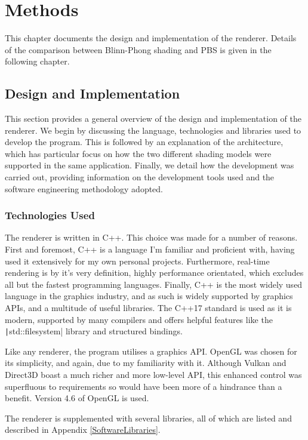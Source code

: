 \chapter{Methods}
\label{chapter2}

This chapter documents the design and implementation of the renderer. Details of the comparison between Blinn-Phong shading and PBS is given in the following chapter.

\section{Design and Implementation}

This section provides a general overview of the design and implementation of the renderer. We begin by discussing the language, technologies and libraries used to develop the program. This is followed by an explanation of the architecture, which has particular focus on how the two different shading models were supported in the same application. Finally, we detail how the development was carried out, providing information on the development tools used and the software engineering methodology adopted.

\subsection{Technologies Used}

The renderer is written in C++. This choice was made for a number of reasons. First and foremost, C++ is a language I'm familiar and proficient with, having used it extensively for my own personal projects. Furthermore, real-time rendering is by it's very definition, highly performance orientated, which excludes all but the fastest programming languages. Finally, C++ is the most widely used language in the graphics industry, and as such is widely supported by graphics APIs, and a multitude of useful libraries. The C++17 standard is used as it is modern, supported by many compilers and offers helpful features like the \texttt|std::filesystem| library and structured bindings.

Like any renderer, the program utilises a graphics API. OpenGL was chosen for its simplicity, and again, due to my familiarity with it. Although Vulkan and Direct3D boast a much richer and more low-level API, this enhanced control was superfluous to requirements so would have been more of a hindrance than a benefit. Version 4.6 of OpenGL is used.

The renderer is supplemented with several libraries, all of which are listed and described in Appendix \ref{SoftwareLibraries}.

